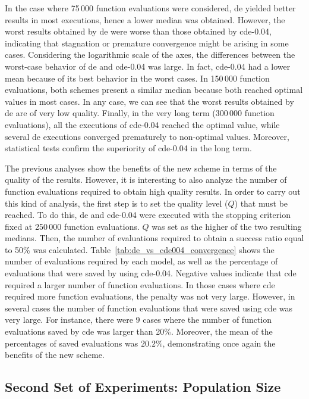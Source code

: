 \documentclass[review,3p]{elsarticle}
\newcommand{\CDE}{c{\sc de}}
\newcommand{\DE}{{\sc de}}
\begin{document}
%
In the case where 75$\,$000 function evaluations were considered, \DE{} yielded better results in most executions, hence a lower median was obtained.
%
However, the worst results obtained by \DE{} were worse than those obtained by
\CDE{}-0.04, indicating that stagnation or premature convergence might be arising in some cases.
%
Considering the logarithmic scale of the axes, the differences between the worst-case behavior of \DE{} and \CDE{}-0.04 was large.
%
In fact, \CDE{}-0.04 had a lower mean because of its best behavior in the worst cases.
%
In 150$\,$000 function evaluations, both schemes present a similar median because both reached optimal values in most cases.
%
In any case, we can see that the worst results obtained by \DE{} are of very low quality.
%
Finally, in the very long term (300$\,$000 function evaluations), all the executions of \CDE{}-0.04
reached the optimal value, while several \DE{} executions converged prematurely to non-optimal
values.
%
Moreover, statistical tests confirm the superiority of \CDE{}-0.04 in the long term.


The previous analyses show the benefits of the new scheme in terms of the quality of the results.
%
However, it is interesting to also analyze the number of function evaluations required to obtain high quality results.
%
In order to carry out this kind of analysis, the first step is to set the quality level ($Q$) that must be reached.
%
To do this, \DE{} and \CDE{}-0.04 were executed with the stopping criterion fixed at 250$\,$000 function evaluations.
%
$Q$ was set as the higher of the two resulting medians.
%
Then, the number of evaluations required to obtain a success ratio equal to 50\% was calculated.
%
Table~\ref{tab:de_vs_cde004_convergence} shows the number of evaluations required by each model, as well as the percentage of evaluations
that were saved by using \CDE{}-0.04.
%
Negative values indicate that \CDE{} required a larger number of function evaluations.
%
In those cases where \CDE{} required more function evaluations, the penalty was not very large.
%
However, in several cases the number of function evaluations that were saved using \CDE{} was very large.
%
For instance, there were 9 cases where the number of function evaluations saved by \CDE{} was larger than 20\%.
%
Moreover, the mean of the percentages of saved evaluations was $20.2\%$, demonstrating once again the benefits of the new scheme.



\subsection{Second Set of Experiments: Population Size}
\end{document}
